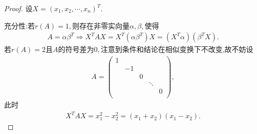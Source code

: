 \documentclass[../../main.tex]{subfiles}%
\begin{document}
\begin{proof}
设$X=( x_1,x_2,\cdots ,x_n ) ^T$.

{\heiti 充分性:}若$r( A ) =1,$则存在非零实向量$\alpha ,\beta ,$使得
\begin{align*}
A=\alpha \beta ^T\Longrightarrow X^TAX=X^T( \alpha \beta ^T ) X=( X^T\alpha ) ( \beta ^TX ).
\end{align*}
若$r( A ) =2$且$A$的符号差为$0,$注意到条件和结论在相似变换下不改变,故不妨设
\begin{align*}
A=\begin{pmatrix}
1&		&		&		&		\\
&		-1&		&		&		\\
&		&		0&		&		\\
&		&		&		\ddots&		\\
&		&		&		&		0\\
\end{pmatrix},
\end{align*}
此时
\begin{align*}
X^TAX=x_{1}^{2}-x_{2}^{2}=( x_1+x_2 ) ( x_1-x_2 ).
\end{align*}


\end{proof}
\end{document}
